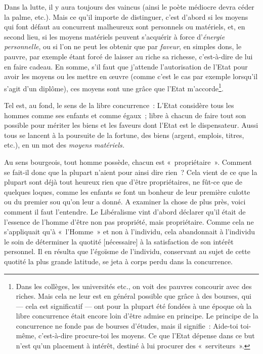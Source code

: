 \documentclass[french,twoside]{book} %
\newcommand\corr[1]{#1}
\begin{document}
Dans la lutte, il y aura toujours des vaincus (ainsi le poète médiocre devra céder la palme, etc.). Mais ce qu’il importe de distinguer, c’est d’abord si les moyens qui font défaut au concurrent malheureux sont personnels ou matériels, et, en second lieu, si les moyens matériels peuvent s’acquérir à force d’\emph{énergie personnelle}, ou si l’on ne peut les obtenir que par \emph{faveur}, en simples dons, le pauvre, par exemple étant forcé de laisser au riche sa richesse, c’est-à-dire de lui en faire cadeau. En somme, s’il faut que j’attende l’autorisation de l’Etat pour avoir les moyens ou les mettre en œuvre (comme c’est le cas par exemple lorsqu’il s’agit d’un diplôme), ces moyens sont une grâce que l’Etat m’accorde\footnote{ \noindent Dans les collèges, les universités etc., on voit des pauvres concourir avec des riches. Mais cela ne leur est en général possible que grâce à des bourses, qui — cela est significatif — ont pour la plupart été fondées à une époque où la libre concurrence était encore loin d’être admise en principe. Le principe de la concurrence ne fonde pas de bourses d’études, mais il signifie : Aide-toi toi-même, c’est-à-dire procure-toi les moyens. Ce que l’Etat dépense dans ce but n’est qu’un placement à intérêt, destiné à lui procurer des « serviteurs ».
 }.\par
Tel est, au fond, le sens de la libre concurrence : L’Etat considère tous les hommes comme ses enfants et comme égaux ; libre à chacun de faire tout son possible pour mériter les biens et les faveurs dont l’Etat est le dispensateur. Aussi tous se lancent à la poursuite de la fortune, des biens (argent, emplois, titres, etc.), en un mot des \emph{moyens matériels.}\par
Au sens bourgeois, tout homme possède, chacun est  « propriétaire ». Comment se fait-il donc que la plupart n’aient pour ainsi dire rien ? Cela vient de ce que la plupart sont déjà tout heureux rien que d’être propriétaires, ne fût-ce que de quelques loques, comme les enfants se font un bonheur de leur première culotte ou du premier sou qu’on leur a donné. A examiner la chose de plus près, voici comment il faut l’entendre. Le Libéralisme vint d’abord déclarer qu’il était de l’essence de l’homme d’être non pas propriété, mais propriétaire. Comme cela ne s’appliquait qu’à « l’Homme » et non à l’individu, cela abandonnait à l’individu le soin de déterminer la quotité [{\corr nécessaire}] à la satisfaction de son intérêt personnel. Il en résulta que l’égoïsme de l’individu, conservant au sujet de cette quotité la plus grande latitude, se jeta à corps perdu dans la concurrence.\par
\end{document}
